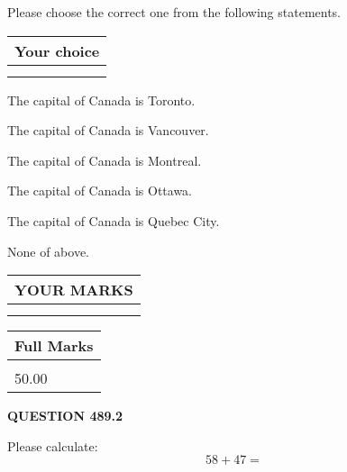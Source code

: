 \documentclass[12pt]{article}
\begin{document}
  
Please choose the correct one from the following statements.
  
  
\noindent\hspace{3.0in} \begin{tabular}{|l|}
\hline
Your choice \\
\hline
 \\ 
 \\ 
\hline
\end{tabular}
  
  
 
 
The capital of Canada is Toronto.
 
 
The capital of Canada is Vancouver.
 
 
The capital of Canada is Montreal.
 
 
The capital of Canada is Ottawa.
 
 
The capital of Canada is Quebec City.
 
 
 None of above.
 
 
  
\vspace{0.2in}
  
\noindent\begin{tabular}{|l|}
\hline
 YOUR MARKS  \\
\hline
 \\ 
 \\ 
\hline
\end{tabular}
\hspace{0.05in} \begin{tabular}{|l|}
\hline
 Full Marks  \\
\hline
 \\ 
50.00 \\
\hline
\end{tabular}
{\textbf{\Large{QUESTION
489.2 
}}}
  
  
 
Please calculate:
\begin{equation}
58 +  %
47 = \nonumber
\end{equation}
 

 

 
   
   
 \vspace{0.2in}
 
   
   
   
   
\end{document}

